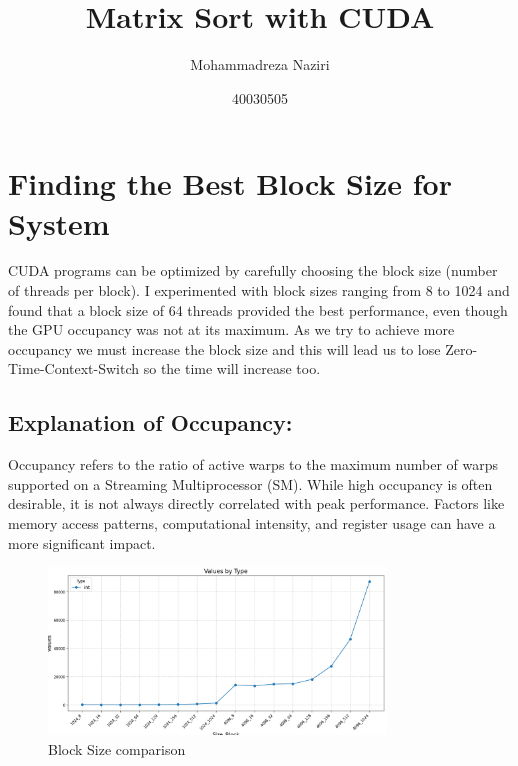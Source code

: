 \documentclass{article}
\title{Matrix Sort with CUDA}
\author{Mohammadreza Naziri}
\date{40030505}
\begin{document}
\maketitle

\section{Finding the Best Block Size for System}

CUDA programs can be optimized by carefully choosing the block size (number of threads per block). I experimented with block sizes ranging from 8 to 1024 and found that a block size of 64 threads provided the best performance, even though the GPU occupancy was not at its maximum. As we try to achieve more occupancy we must increase the block size and this will lead us to lose Zero-Time-Context-Switch so the time will increase too.

\subsection{Explanation of Occupancy:}

Occupancy refers to the ratio of active warps to the maximum number of warps supported on a Streaming Multiprocessor (SM). While high occupancy is often desirable, it is not always directly correlated with peak performance. Factors like memory access patterns, computational intensity, and register usage can have a more significant impact.



\begin{figure}[h!]
    \centering
    \includegraphics[width=0.8\textwidth]{1.png}
    \caption{Block Size comparison}
\end{figure}
\end{document}
